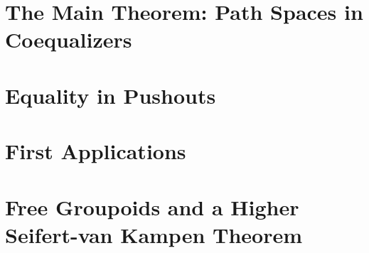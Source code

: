 \section{The Main Theorem: Path Spaces in Coequalizers}\label{sec:paths-main}

\section{Equality in Pushouts}\label{sec:paths-pushout}

\section{First Applications}\label{sec:paths-applications}

\section{Free Groupoids and a Higher Seifert-van Kampen Theorem}\label{sec:paths-svk}








